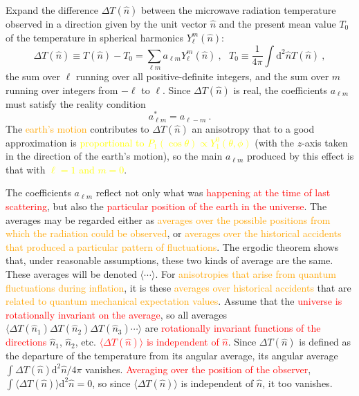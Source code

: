 \documentclass[12pt,a4paper]{article}
\newcommand{\dif}{\mathrm{d}}
\begin{document}
\cite{2008cosm.book.....W} Expand the difference $\Delta T(\hat{n})$ between the microwave radiation temperature observed in a direction given by the unit vector $\hat{n}$ and the present mean value $T_0$ of the temperature in spherical harmonics $Y_\ell^m(\hat{n})$:
\begin{equation}
\Delta T(\hat{n}) \equiv T(\hat{n}) -T_0 = \sum_{\ell m} a_{\ell m} Y_\ell^m(\hat{n}) ~, ~~~ T_0 \equiv \dfrac{1}{4\pi} \int \dif^2 \hat{n} T(\hat{n}) ~,
\end{equation}
the sum over $\ell$ running over all positive-definite integers, and the sum over $m$ running over integers from $-\ell$ to $\ell$. Since $\Delta T(\hat{n})$ is real, the coefficients $a_{\ell m}$ must satisfy the reality condition
\begin{equation}
a^\ast_{\ell m} = a_{\ell -m} ~.
\end{equation}
The \textcolor{orange}{earth's motion} contributes to $\Delta T(\hat{n})$ an anisotropy that to a good approximation is \textcolor{yellow}{proportional to $P_1(\cos \theta) \propto Y_1^0(\theta, \phi)$} (with the $z$-axis taken in the direction of the earth's motion), so the main $a_{\ell m}$ produced by this effect is that with \textcolor{yellow}{$\ell = 1$ and $m = 0$}.

The coefficients $a_{\ell m}$ reflect not only what was \textcolor{red}{happening at the time of last scattering}, but also the \textcolor{red}{particular position of the earth in the universe}. The averages may be regarded either as  \textcolor{orange}{averages over the possible positions from which the radiation could be observed}, or  \textcolor{orange}{averages over the historical accidents that produced a particular pattern of fluctuations}. The ergodic theorem shows that, under reasonable assumptions, these two kinds of average are the same. These averages will be denoted $\langle \cdots \rangle$. For \textcolor{orange}{anisotropies that arise from quantum fluctuations during inflation}, it is these  \textcolor{orange}{averages over historical accidents} that are  \textcolor{orange}{related to quantum mechanical expectation values}. Assume that the \textcolor{red}{universe is rotationally invariant on the average}, so all averages $\langle \Delta T(\hat{n}_1)\Delta T(\hat{n}_2)\Delta T(\hat{n}_3) \cdots \rangle$ are \textcolor{red}{rotationally invariant functions of the directions} $\hat{n}_1$, $\hat{n}_2$, etc. \textcolor{red}{$\langle \Delta T(\hat{n}) \rangle$ is independent of $\hat{n}$}. Since $ \Delta T(\hat{n})$ is defined as the departure of the temperature from its angular average, its angular average $\int \Delta T(\hat{n}) \dif^2 \hat{n}/4\pi$  vanishes. \textcolor{red}{Averaging over the position of the observer}, $\int \langle \Delta T(\hat{n}) \rangle \dif^2 \hat{n} = 0$, so since $\langle \Delta T(\hat{n}) \rangle$ is independent of $\hat{n}$, it too vanishes. 
\end{document}
